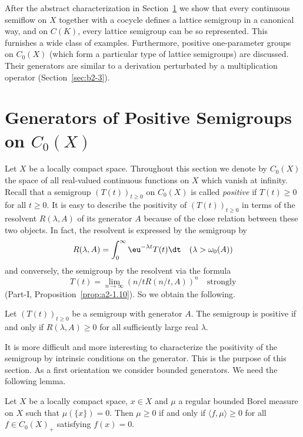 After the abstract characterization in Section~\ref{sec:b2-1} we show that every continuous semiflow on $X$ together with a cocycle defines a lattice semigroup in a canonical way, and on $C(K)$, every lattice semigroup can be so represented.
This furnishes a wide class of examples.
Furthermore, positive one-parameter groups on $C_{0}(X)$ (which form a particular type of lattice semigroups) are discussed.
Their generators are similar to a derivation perturbated by a multiplication operator (Section~\ref{sec:b2-3}).

\section{Generators of Positive Semigroups on  \texorpdfstring{$C_{0}(X)$}{C(X)}} \label{sec:b2-1}%
Let $X$ be a locally compact space.
Throughout this section we denote by $C_{0}(X)$ the space of all real-valued continuous functions on $X$ which vanish at infinity.
Recall that a semigroup $(T(t))_{t \geq 0}$ on $C_{0}(X)$ is called \emph{positive} if\/ $T(t) \geq 0$ for all $t \geq 0$.
It is easy to describe the positivity of\/ $(T(t))_{t \geq 0}$ in terms of the resolvent $R(\lambda,A)$ of its generator $A$ because of the close relation between these two objects.
In fact, the resolvent is expressed by the semigroup by
\begin{equation}\label{eq:b2-1.1}
R(\lambda,A) = \int_{0}^{\infty} \eu^{-\lambda t} T(t) \dt \quad (\lambda > \omega_{0}(A))
\end{equation}
and conversely, the semigroup by the resolvent via the formula
\begin{equation}\label{eq:b2-1.2}
T(t) = \lim_{n \to \infty} (n/tR(n/t,A))^{n} \quad \text{strongly}
\end{equation}
(\cf Part-I, Proposition~\ref{prop:a2-1.10}).
So we obtain the following.
\begin{proposition}\label{prop:b2-1.1}%
Let $(T(t))_{t \geq 0}$ be a semigroup with generator $A$.
The semigroup is positive if and only if\/ $R(\lambda,A) \geq 0$ for all sufficiently large real $\lambda$.
\end{proposition}
It is more difficult and more interesting to characterize the positivity of the semigroup by intrinsic conditions on the generator.
This is the purpose of this section.
As a first orientation we consider bounded generators.
We need the following lemma.
\begin{lemma}\label{lem:b2-1.2}
Let $X$ be a locally compact space, $x \in X$ and $\mu$ a regular bounded Borel measure on $X$ such that $\mu(\{x\}) = 0$.
Then $\mu \geq 0$ if and only if\/ $\langle f,\mu \rangle \geq 0$ for all $f \in C_{0}(X)_{+}$ satisfying $f(x) = 0$.
\end{lemma}
